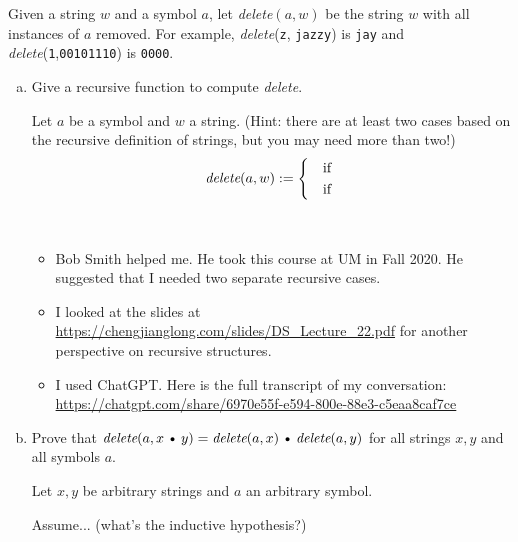 \documentclass[11pt]{article}
\def\Cdot{\mathbin{\text{\normalfont \textbullet}}}
\def\Sym#1{\texttt{\color{BrickRed}#1}}
\begin{document}


\noindent Given a string $w$ and a symbol $a$, let \emph{delete}$(a, w)$ be the string $w$ with all instances of $a$ removed. For example, \emph{delete}(\Sym{z}, \Sym{jazzy}) is \Sym{jay} and \emph{delete}(\Sym{1},\Sym{00101110}) is \Sym{0000}.

\begin{enumerate}[(a)]
	\item 

Give a recursive function to compute \emph{delete}.


\begin{Solution}
Let $a$ be a symbol and $w$ a string.
(Hint: there are at least two cases based on the recursive definition of strings, but you may need more than two!)
\[
	\emph{delete}(a,w) := \begin{cases}
		 & \text{if }\\[0.25ex]
		 & \text{if }\\
	\end{cases}
\]
\end{Solution}

\begin{Sources}~ %
\begin{itemize}
    \item  Bob Smith helped me. He took this course at UM in Fall 2020. He suggested that I needed two separate recursive cases.
    \item I looked at the slides at \url{https://chengjianglong.com/slides/DS_Lecture_22.pdf} for another perspective on recursive structures.
	\item I used ChatGPT. Here is the full transcript of my conversation:\\
	 \url{https://chatgpt.com/share/6970e55f-e594-800e-88e3-c5eaa8caf7ce}

\end{itemize}
\end{Sources}

\newpage

\item 
Prove that $\emph{delete}(a, x \Cdot y) = \emph{delete}(a, x) \Cdot \emph{delete}(a,y)$ for all strings $x,y$ and all symbols $a$.

\begin{Solution}
\parindent0pt
Let $x,y$ be arbitrary strings and $a$ an arbitrary symbol.

Assume... (what's the inductive hypothesis?)


\end{Solution}
\end{enumerate}
\end{document}
